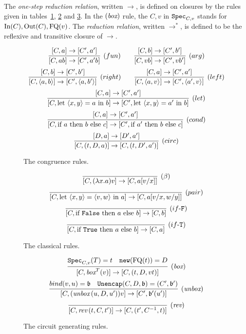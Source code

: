 \documentclass[twoside]{article}
\begin{document}

\begin{definition}
The \emph{one-step reduction relation}, written $\to$, is defined 
on closures by the rules given in tables~\hyperref[cong_rules]{\ref*{cong_rules}}, 
\hyperref[classical_rules]{\ref*{classical_rules}} 
and \hyperref[circ_gen_rules]{\ref*{circ_gen_rules}}. 
In the $(\mathop{\textit{box}}\nolimits)$ rule, the $C,v$ in $\texttt{Spec}_{C,v}$ stands for $\mathop{\textrm{In}}\nolimits(C),\mathop{\textrm{Out}}\nolimits(C),\mathop{\textrm{FQ}}\nolimits(v)$.
The \emph{reduction relation}, 
written $\to^*$, is defined to be the reflexive and transitive closure of $\to$.
\end{definition}

\begin{figure}[!ht]
\begin{mdframed}
\[
  \infer[(fun)]{[C,ab]\to[C',a'b]}{
    [C,a]\to[C',a']
  }
~~~~~~
  \infer[(arg)]{[C,vb]\to [C',vb']}{
    [C,b]\to [C',b']
  }
\]
\[
  \infer[(right)]{[C,\langle a,b\rangle]\to [C',\langle a,b'\rangle]}{
    [C,b]\to [C',b']
  }
~~~~~~
  \infer[(left)]{[C,\langle a,v\rangle]\to [C',\langle a',v\rangle]}{
    [C,a]\to [C',a']
  }
\]
\[
  \infer[(let)]{[C,\letin{\p{x,y}}{a}{b}]\to 
                [C', \letin{\p{x,y}}{a'}{b}]}{
    [C,a]\to [C',a']
  }
\]
\[
  \infer[(cond)]{[C, \ifthenelse{a}{b}{c}]\to [C', \ifthenelse{a'}{b}{c}]}{
    [C,a]\to [C',a']
  }
\]
\[
  \infer[(circ)]{[C, (t,D,a)]\to [C, (t,D',a')]}{
    [D,a]\to [D',a']
  }
\]
\end{mdframed}
\caption{The congruence rules.}
\label{cong_rules}
\end{figure}

\begin{figure}[!ht]
\begin{mdframed}
\[
  \infer[(\beta)]{[C,(\lambda x.a)v]\to [C, a[v/x]]}{}
\]
\[
  \infer[(pair)]{[C,\letin{\p{x,y}}{\p{v,w}}{a}]\to[C,a[v/x,w/y]]}{}
\]
\[
  \infer[(if\mbox{-}\mathtt{F})]{[C,\ifthenelse{\mathtt{False}}{a}{b}] \to [C, b]}{}
\]
\[
  \infer[(if\mbox{-}\mathtt{T})]{[C,\ifthenelse{\mathtt{True}}{a}{b}] \to [C, a]}{}
\]
\end{mdframed}
\caption{The classical rules.}
\label{classical_rules}
\end{figure}

\begin{figure}[!ht]
\begin{mdframed}
\[
  \infer[(\boxx)]{[C,\boxx^T(v)]\to [C,(t,D,vt)]}{
    \spec_{C,v}(T)=t
    &
    \mathtt{new}(\FQ(t))=D
  }
\]
\[
  \infer[(\unbox)]{[C,(\unbox\,(u,D,u'))v]\to [C',\binding'(u')]}{
    bind(v,u)=\binding 
    &
    \mathtt{Unencap}(C,D,\binding) = (C',\binding') 
  }
\]
\[
  \infer[(\rev)]{[C,\rev\,(t,C,t')]\to [C,(t',C^{-1},t)]}{}
\]
\end{mdframed}
\caption{The circuit generating rules.}
\label{circ_gen_rules}
\end{figure}
\end{document}
